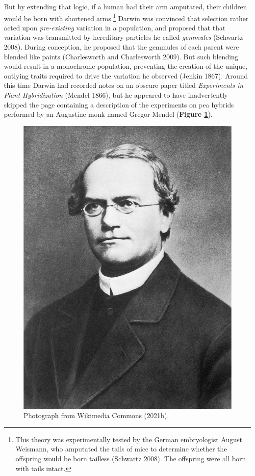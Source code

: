 \documentclass[
]{book}
\begin{document}
But by extending that logic, if a human had their arm amputated, their children would be born with shortened arms.\footnote{This theory was experimentally tested by the German embryologist August Weismann, who amputated the tails of mice to determine whether the offspring would be born tailless (Schwartz 2008). The offspring were all born with tails intact.} Darwin was convinced that selection rather acted upon \emph{pre-existing} variation in a population, and proposed that that variation was transmitted by hereditary particles he called \emph{gemmules} (Schwartz 2008). During conception, he proposed that the gemmules of each parent were blended like paints (Charlesworth and Charlesworth 2009). But such blending would result in a monochrome population, preventing the creation of the unique, outlying traits required to drive the variation he observed (Jenkin 1867). Around this time Darwin had recorded notes on an obscure paper titled \emph{Experiments in Plant Hybridization} (Mendel 1866), but he appeared to have inadvertently skipped the page containing a description of the experiments on pea hybrids performed by an Augustine monk named Gregor Mendel (\textbf{Figure \ref{fig:mendel}}).



\begin{figure}

{\centering \includegraphics[width=0.6\linewidth]{figs/introduction/Gregor_Mendel_2} 

}

\caption{Photograph from Wikimedia Commons (2021b).}\label{fig:mendel}
\end{figure}
\end{document}
